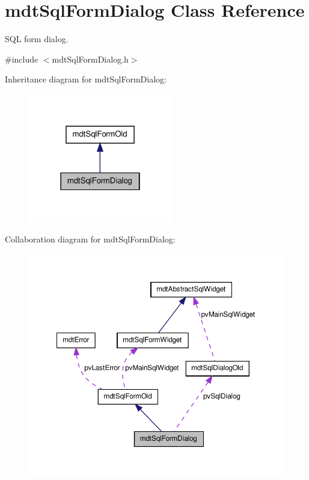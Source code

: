 \hypertarget{classmdt_sql_form_dialog}{
\section{mdtSqlFormDialog Class Reference}
\label{classmdt_sql_form_dialog}
}


SQL form dialog.  




{\ttfamily \#include $<$mdtSqlFormDialog.h$>$}



Inheritance diagram for mdtSqlFormDialog:\nopagebreak
\begin{figure}[H]
\begin{center}
\leavevmode
\includegraphics[width=178pt]{classmdt_sql_form_dialog__inherit__graph}
\end{center}
\end{figure}


Collaboration diagram for mdtSqlFormDialog:\nopagebreak
\begin{figure}[H]
\begin{center}
\leavevmode
\includegraphics[width=362pt]{classmdt_sql_form_dialog__coll__graph}
\end{center}
\end{figure}

